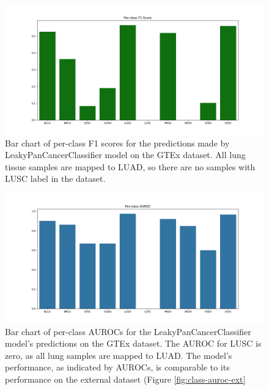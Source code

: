 \documentclass{l4proj}
\begin{document}
\begin{appendices}
\begin{figure}
    \centering
    \includegraphics[width=\linewidth]{images/per_class_f1_gtex.png}
    \caption{Bar chart of per-class F1 scores for the predictions made by LeakyPanCancerClassifier model on the GTEx dataset. All lung tissue samples are mapped to LUAD, so there are no samples with LUSC label in the dataset.}
    \label{fig:class-f1-gtex}
\end{figure}

\begin{figure}
    \centering
    \includegraphics[width=1\linewidth]{images/gtex_auroc.png}
    \caption{Bar chart of per-class AUROCs for the LeakyPanCancerClassifier model's predictions on the GTEx dataset. The AUROC for LUSC is zero, as all lung samples are mapped to LUAD.  The model's performance, as indicated by AUROCs, is comparable to its performance on the external dataset (Figure \ref{fig:class-auroc-ext}}
    \label{fig:gtex-auroc}
\end{figure}


\end{appendices}
\end{document}
